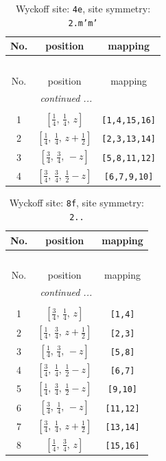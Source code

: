 \documentclass[fleqn,8pt]{jsarticle}
\begin{document}
\renewcommand{\arraystretch}{1.2}
\begin{longtable}{ccc}
\caption{Wyckoff site: {\tt 4e}, site symmetry: {\tt 2.m'm'}}
 \\
 \hline \hline
No. & position & mapping \\ \hline \endfirsthead

\multicolumn{2}{l}{\tablename\ \thetable{}} \\
 \hline \hline
No. & position & mapping \\ \hline \endhead

 \hline \hline
\multicolumn{2}{r}{\footnotesize\it continued ...} \\ \endfoot

 \hline \hline
\multicolumn{2}{r}{} \\ \endlastfoot

1 & $\left[ \frac{1}{4},\, \frac{1}{4},\, z \right]$ & {\tt [1,4,15,16]} \\ \hline
2 & $\left[ \frac{1}{4},\, \frac{1}{4},\, z + \frac{1}{2} \right]$ & {\tt [2,3,13,14]} \\ \hline
3 & $\left[ \frac{3}{4},\, \frac{3}{4},\, - z \right]$ & {\tt [5,8,11,12]} \\ \hline
4 & $\left[ \frac{3}{4},\, \frac{3}{4},\, \frac{1}{2} - z \right]$ & {\tt [6,7,9,10]} \\
\end{longtable}
\renewcommand{\arraystretch}{1.2}
\begin{longtable}{ccc}
\caption{Wyckoff site: {\tt 8f}, site symmetry: {\tt 2..}}
 \\
 \hline \hline
No. & position & mapping \\ \hline \endfirsthead

\multicolumn{2}{l}{\tablename\ \thetable{}} \\
 \hline \hline
No. & position & mapping \\ \hline \endhead

 \hline \hline
\multicolumn{2}{r}{\footnotesize\it continued ...} \\ \endfoot

 \hline \hline
\multicolumn{2}{r}{} \\ \endlastfoot

1 & $\left[ \frac{3}{4},\, \frac{1}{4},\, z \right]$ & {\tt [1,4]} \\ \hline
2 & $\left[ \frac{1}{4},\, \frac{3}{4},\, z + \frac{1}{2} \right]$ & {\tt [2,3]} \\ \hline
3 & $\left[ \frac{1}{4},\, \frac{3}{4},\, - z \right]$ & {\tt [5,8]} \\ \hline
4 & $\left[ \frac{3}{4},\, \frac{1}{4},\, \frac{1}{2} - z \right]$ & {\tt [6,7]} \\ \hline
5 & $\left[ \frac{1}{4},\, \frac{3}{4},\, \frac{1}{2} - z \right]$ & {\tt [9,10]} \\ \hline
6 & $\left[ \frac{3}{4},\, \frac{1}{4},\, - z \right]$ & {\tt [11,12]} \\ \hline
7 & $\left[ \frac{3}{4},\, \frac{1}{4},\, z + \frac{1}{2} \right]$ & {\tt [13,14]} \\ \hline
8 & $\left[ \frac{1}{4},\, \frac{3}{4},\, z \right]$ & {\tt [15,16]} \\
\end{longtable}
\end{document}
